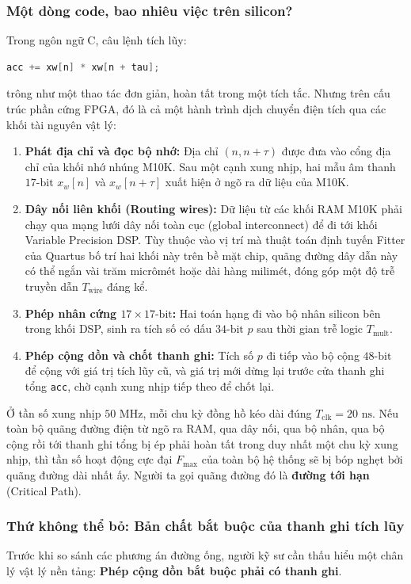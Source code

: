 \subsubsection*{Một dòng code, bao nhiêu việc trên silicon?}
Trong ngôn ngữ C, câu lệnh tích lũy:
\begin{lstlisting}[language=C, numbers=none]
acc += xw[n] * xw[n + tau];
\end{lstlisting}
trông như một thao tác đơn giản, hoàn tất trong một tích tắc. Nhưng trên cấu trúc phần cứng FPGA, đó là cả một hành trình dịch chuyển điện tích qua các khối tài nguyên vật lý:
\begin{enumerate}[leftmargin=1.5em, itemsep=2pt]
    \item \textbf{Phát địa chỉ và đọc bộ nhớ:} Địa chỉ $(n, n+\tau)$ được đưa vào cổng địa chỉ của khối nhớ nhúng M10K. Sau một cạnh xung nhịp, hai mẫu âm thanh $17\text{-bit}$ $x_w[n]$ và $x_w[n+\tau]$ xuất hiện ở ngõ ra dữ liệu của M10K.
    \item \textbf{Dây nối liên khối (Routing wires):} Dữ liệu từ các khối RAM M10K phải chạy qua mạng lưới dây nối toàn cục (global interconnect) để đi tới khối Variable Precision DSP. Tùy thuộc vào vị trí mà thuật toán định tuyến Fitter của Quartus bố trí hai khối này trên bề mặt chip, quãng đường dây dẫn này có thể ngắn vài trăm micrômét hoặc dài hàng milimét, đóng góp một độ trễ truyền dẫn $T_{\text{wire}}$ đáng kể.
    \item \textbf{Phép nhân cứng $17 \times 17\text{-bit}$:} Hai toán hạng đi vào bộ nhân silicon bên trong khối DSP, sinh ra tích số có dấu $34\text{-bit}$ $p$ sau thời gian trễ logic $T_{\text{mult}}$.
    \item \textbf{Phép cộng dồn và chốt thanh ghi:} Tích số $p$ đi tiếp vào bộ cộng $48\text{-bit}$ để cộng với giá trị tích lũy cũ, và giá trị mới dừng lại trước cửa thanh ghi tổng \texttt{acc}, chờ cạnh xung nhịp tiếp theo để chốt lại.
\end{enumerate}

Ở tần số xung nhịp $50\text{ MHz}$, mỗi chu kỳ đồng hồ kéo dài đúng $T_{\text{clk}} = 20\text{ ns}$. Nếu toàn bộ quãng đường điện từ ngõ ra RAM, qua dây nối, qua bộ nhân, qua bộ cộng rồi tới thanh ghi tổng bị ép phải hoàn tất trong duy nhất một chu kỳ xung nhịp, thì tần số hoạt động cực đại $F_{\max}$ của toàn bộ hệ thống sẽ bị bóp nghẹt bởi quãng đường dài nhất ấy. Người ta gọi quãng đường đó là \textbf{đường tới hạn} (Critical Path).

\subsubsection*{Thứ không thể bỏ: Bản chất bắt buộc của thanh ghi tích lũy}
Trước khi so sánh các phương án đường ống, người kỹ sư cần thấu hiểu một chân lý vật lý nền tảng: \textbf{Phép cộng dồn bắt buộc phải có thanh ghi}. 

